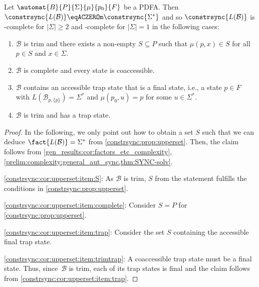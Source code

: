 \begin{corollary}\label{constrsync:cor:upperset}
	Let $\automat{B}{P}{\Sigma}{\mu}{p_0}{F}$ be a PDFA.
	Then 
	$\constrsync{L(\mathcal B)} \eqACZEROm \constrsync{\Sigma^*}$
	and so $\constrsync{L(\mathcal B)}$ is \NL-complete
	for $|\Sigma| \ge 2$
	and \LOGSPACE-complete for $|\Sigma| = 1$
	in the following cases:
	\begin{enumerate}
		\item \label{constrsync:cor:upperset:item:S} $\mathcal B$ is trim and there exists a non-empty $S \subseteq P$ such that $\mu(p,x) \in S$ for all $p \in S$ and $x \in \Sigma$. 
		
		\item \label{constrsync:cor:upperset:item:complete} $\mathcal B$ is complete
		and every state is coaccessible.
		
		\item \label{constrsync:cor:upperset:item:trap} $\mathcal B$ contains an accessible trap state
		that is a final state, i.e., 
		a state $p \in F$ with $L(\mathcal B_{p,\{p\}}) = \Sigma^*$
		and $\mu(p_0, u) = p$ for some $u \in \Sigma^*$.
		
		\item \label{constrsync:cor:upperset:item:trimtrap} $\mathcal B$ is trim and has a trap state.     
	\end{enumerate}
\end{corollary} 
\begin{proof}
	In the following, we only point out how to obtain
	a set $S$ such that we can deduce $\fact{L(\mathcal B)} = \Sigma^*$
	from \cref{constrsync:prop:upperset}.
	Then, the claim follows
	from \cref{gen_results:cor:factors_etc_complexity}, 
    \cref{prelim:complexity:general_aut_sync,thm:SYNC-solv}.

\ref{constrsync:cor:upperset:item:S}: As $\mathcal B$ is trim, $S$ from the statement fulfills the conditions in \cref{constrsync:prop:upperset}.

\ref{constrsync:cor:upperset:item:complete}: Consider $S = P$ for \cref{constrsync:prop:upperset}.

\ref{constrsync:cor:upperset:item:trap}: Consider the set $S$ containing the accessible final trap state.
	
\ref{constrsync:cor:upperset:item:trimtrap}: A coaccessible trap state must be a final state.
 Thus, since~$\mathcal B$ is trim, each of its trap states is final
 and the claim follows from \cref{constrsync:cor:upperset:item:trap}.
\end{proof} 

